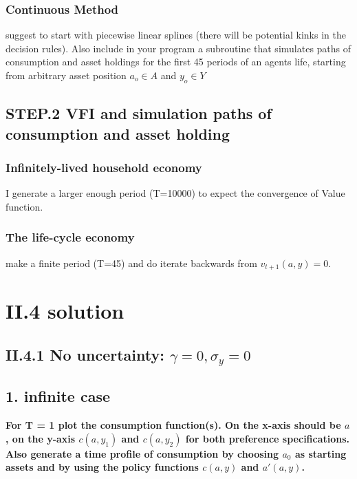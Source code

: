 \documentclass{article}[a4paper]
\begin{document}
\subsubsection{Continuous Method}
suggest to start with piecewise linear splines (there will be potential kinks in the decision rules). Also include in your program a subroutine that simulates paths of consumption and asset holdings for the first 45 periods of an agents life, starting from arbitrary asset position $a_o \in A$ and $y_o \in Y$

\subsection{STEP.2 VFI and simulation paths of consumption and asset holding}

\subsubsection{Infinitely-lived household economy}
I generate a larger enough period (T=10000) to expect the convergence of Value function. 
\subsubsection{The life-cycle economy}
make a finite period (T=45) and do iterate backwards from $v_{t+1}(a,y)=0$.

\section{II.4 solution}

\subsection{II.4.1 No uncertainty: $\gamma=0, \sigma_y = 0 $}
\subsection{1. infinite case}
\textbf{For T = 1 plot the consumption function(s). On the x-axis should be $a$, on the y-axis $c(a, y_1)$ and $c(a,y_2)$ for both preference specifications. Also generate a time profile of consumption by choosing $a_0$ as starting assets and by using the policy functions $c(a,y)$ and $a'(a,y)$.}
\end{document}
